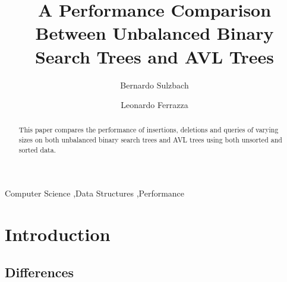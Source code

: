 \documentclass[12pt]{elsarticle}
\begin{document}
\begin{frontmatter}


    \title{A Performance Comparison Between Unbalanced Binary Search Trees and AVL Trees}




    \author{Bernardo Sulzbach}

    \author{Leonardo Ferrazza}

    \address{Rio Grande do Sul, Brazil}

    \begin{abstract}
    This paper compares the performance of insertions, deletions and queries of
    varying sizes on both unbalanced binary search trees and AVL trees using
    both unsorted and sorted data.
    \end{abstract}

    \begin{keyword}
        Computer Science \sep Data Structures \sep Performance
    \end{keyword}

\end{frontmatter}


\section{Introduction}

\subsection{Differences}
\end{document}
